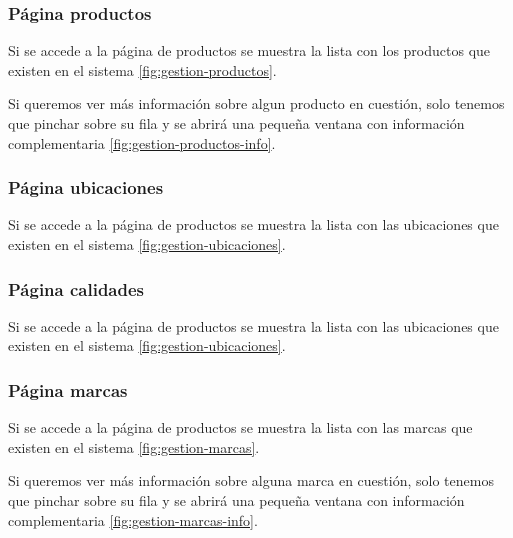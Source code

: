 
\subsubsection{Página productos}

Si se accede a la página de productos se muestra la lista con los productos que existen en el sistema \ref{fig:gestion-productos}.


Si queremos ver más información sobre algun producto en cuestión, solo tenemos que pinchar sobre su fila y se abrirá una pequeña ventana con información complementaria \ref{fig:gestion-productos-info}.


\subsubsection{Página ubicaciones}

Si se accede a la página de productos se muestra la lista con las ubicaciones que existen en el sistema \ref{fig:gestion-ubicaciones}.


\subsubsection{Página calidades}

Si se accede a la página de productos se muestra la lista con las ubicaciones que existen en el sistema \ref{fig:gestion-ubicaciones}.


\subsubsection{Página marcas}

Si se accede a la página de productos se muestra la lista con las marcas que existen en el sistema \ref{fig:gestion-marcas}.


Si queremos ver más información sobre alguna marca en cuestión, solo tenemos que pinchar sobre su fila y se abrirá una pequeña ventana con información complementaria \ref{fig:gestion-marcas-info}.

